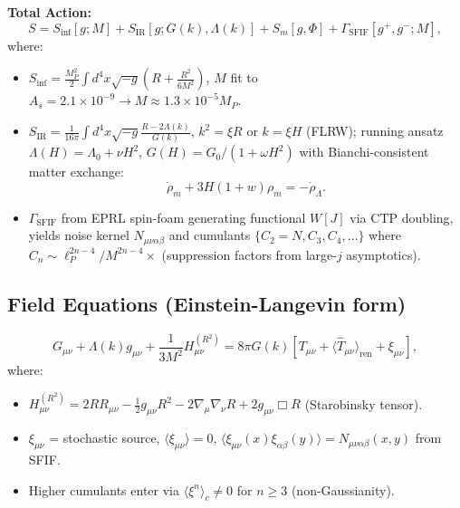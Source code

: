 \documentclass[12pt,a4paper]{article}
\begin{document}
\textbf{Total Action:}
\begin{equation}
S = S_{\text{inf}}[g; M] + S_{\text{IR}}[g; G(k), \Lambda(k)] + S_m[g, \Phi] + \Gamma_{\text{SFIF}}[g^+, g^-; M],
\end{equation}
where:
\begin{itemize}
\item \(S_{\text{inf}} = \frac{M_P^2}{2} \int d^4 x \sqrt{-g} \left(R + \frac{R^2}{6M^2}\right)\), \(M\) fit to \(A_s = 2.1 \times 10^{-9} \to M \approx 1.3 \times 10^{-5} M_P\).

\item \(S_{\text{IR}} = \frac{1}{16\pi} \int d^4 x \sqrt{-g} \frac{R - 2\Lambda(k)}{G(k)}\), \(k^2 = \xi R\) or \(k = \xi H\) (FLRW); running ansatz \(\Lambda(H) = \Lambda_0 + \nu H^2\), \(G(H) = G_0/(1 + \omega H^2)\) with Bianchi-consistent matter exchange:
\begin{equation}
\dot{\rho}_m + 3H(1 + w)\rho_m = -\dot{\rho}_\Lambda.
\end{equation}

\item \(\Gamma_{\text{SFIF}}\) from EPRL spin-foam generating functional \(W[J]\) via CTP doubling, yields noise kernel \(N_{\mu\nu\alpha\beta}\) and cumulants \(\{C_2 = N, C_3, C_4, \ldots\}\) where \(C_n \sim \ell_P^{2n-4}/M^{2n-4} \times\) (suppression factors from large-\(j\) asymptotics).
\end{itemize}

\subsection{Field Equations (Einstein-Langevin form)}

\begin{equation}
G_{\mu\nu} + \Lambda(k) g_{\mu\nu} + \frac{1}{3M^2} H_{\mu\nu}^{(R^2)} = 8\pi G(k) [T_{\mu\nu} + \langle \hat{T}_{\mu\nu} \rangle_{\text{ren}} + \xi_{\mu\nu}],
\end{equation}
where:
\begin{itemize}
\item \(H_{\mu\nu}^{(R^2)} = 2R R_{\mu\nu} - \frac{1}{2} g_{\mu\nu} R^2 - 2\nabla_\mu \nabla_\nu R + 2g_{\mu\nu} \Box R\) (Starobinsky tensor).
\item \(\xi_{\mu\nu}\) = stochastic source, \(\langle \xi_{\mu\nu} \rangle = 0\), \(\langle \xi_{\mu\nu}(x) \xi_{\alpha\beta}(y) \rangle = N_{\mu\nu\alpha\beta}(x, y)\) from SFIF.
\item Higher cumulants enter via \(\langle \xi^n \rangle_c \neq 0\) for \(n \geq 3\) (non-Gaussianity).
\end{itemize}
\end{document}
